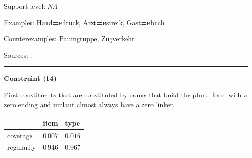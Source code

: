 \vspace{-1.35em}

\noindent
Support level: \textit{NA}

\vspace{0.3em}

\noindent
Examples: Hand\textbf{=e}druck, Arzt\textbf{=e}streik, Gast\textbf{=e}buch

\noindent
Counterexamples: Baum{\zeroLinker}gruppe, Zug{\zeroLinker}verkehr

\vspace{0.3em}

\noindent
Sources: \citet[81]{nuebling_szczepaniak_2013}, \citet[29]{schaefer_pankratz_2018}

\vspace{0.35em}
\hrule




\vspace{0.4em}

\begin{center}
\textbf{Constraint (14)}
\end{center}

\noindent
First constituents that are constituted by nouns that build the plural form with a zero ending and umlaut almost always have a zero linker.
\vspace{0.5em}


\vspace{-0.25em}

\begin{table}[!ht]
\begin{center}
\setlength{\extrarowheight}{1pt}
\begin{tabularx}{\columnwidth}{|X|X|X|}
\hline
 & item & type \\
\hline
 coverage & $0.007$ & $0.016$ \\
\hline
 regularity & $0.946$ & $0.967$ \\
\hline
\end{tabularx}
\end{center}
\end{table}

